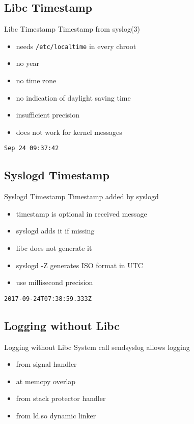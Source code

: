 \documentclass[14pt]{beamer}
\begin{document}
\subsection{Libc Timestamp}
\begin{frame}{Libc Timestamp}
    Timestamp from syslog(3)
\begin{itemize}
    \item needs \texttt{/etc/localtime} in every chroot
    \item no year
    \item no time zone
    \item no indication of daylight saving time
    \item insufficient precision
    \item does not work for kernel messages
\end{itemize}
    \vspace{.5cm}
    \texttt{Sep 24 09:37:42}
\end{frame}

\subsection{Syslogd Timestamp}
\begin{frame}{Syslogd Timestamp}
    Timestamp added by syslogd
\begin{itemize}
    \item timestamp is optional in received message
    \item syslogd adds it if missing
    \item libc does not generate it
    \item syslogd -Z generates ISO format in UTC
    \item use millisecond precision
\end{itemize}
    \vspace{.5cm}
    \texttt{2017-09-24T07:38:59.333Z}
\end{frame}

\subsection{Logging without Libc}
\begin{frame}{Logging without Libc}
    System call sendsyslog allows logging
\begin{itemize}
    \item from signal handler
    \item at memcpy overlap
    \item from stack protector handler
    \item from ld.so dynamic linker
\end{itemize}
\end{frame}
\end{document}
